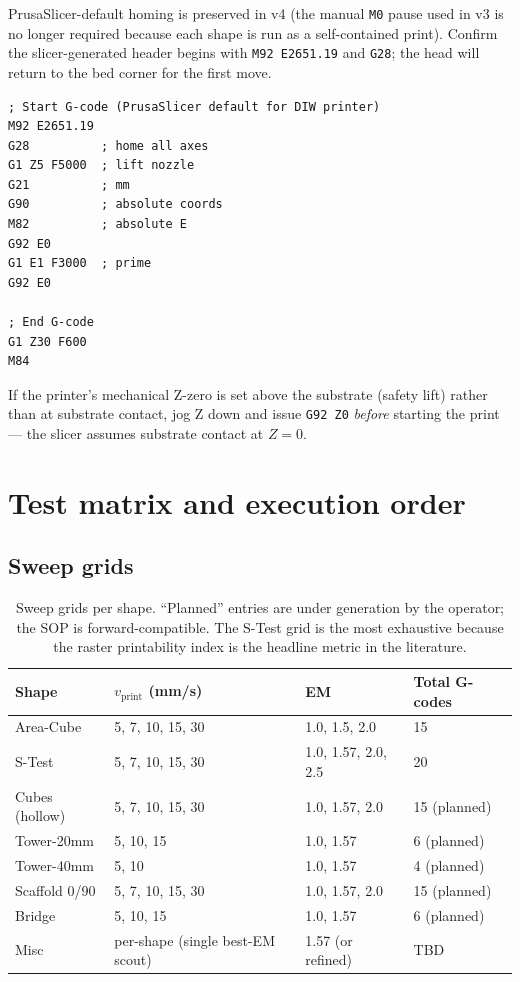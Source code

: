 \documentclass[11pt,a4paper]{article}
\begin{document}
PrusaSlicer-default homing is preserved in v4 (the manual
\texttt{M0} pause used in v3 is no longer required because each
shape is run as a self-contained print). Confirm the
slicer-generated header begins with \texttt{M92 E2651.19} and
\texttt{G28}; the head will return to the bed corner for the
first move.

\begin{lstlisting}[style=shell]
; Start G-code (PrusaSlicer default for DIW printer)
M92 E2651.19
G28          ; home all axes
G1 Z5 F5000  ; lift nozzle
G21          ; mm
G90          ; absolute coords
M82          ; absolute E
G92 E0
G1 E1 F3000  ; prime
G92 E0

; End G-code
G1 Z30 F600
M84
\end{lstlisting}

\begin{warningbox}
If the printer's mechanical Z-zero is set above the substrate
(safety lift) rather than at substrate contact, jog Z down and
issue \texttt{G92 Z0} \emph{before} starting the print --- the
slicer assumes substrate contact at $Z=0$.
\end{warningbox}

\section{Test matrix and execution order}
\label{sec:matrix}

\subsection{Sweep grids}

\begin{table}[h]
\centering
\small
\begin{tabular}{p{2.8cm} p{2.8cm} p{2.8cm} p{2.8cm}}
\toprule
Shape & $v_\mathrm{print}$ (mm/s) & EM & Total G-codes \\
\midrule
Area-Cube & 5, 7, 10, 15, 30 & 1.0, 1.5, 2.0 & 15 \\
S-Test    & 5, 7, 10, 15, 30 & 1.0, 1.57, 2.0, 2.5 & 20 \\
Cubes (hollow) & 5, 7, 10, 15, 30 & 1.0, 1.57, 2.0 & 15 (planned) \\
Tower-20mm & 5, 10, 15 & 1.0, 1.57 & 6 (planned) \\
Tower-40mm & 5, 10 & 1.0, 1.57 & 4 (planned) \\
Scaffold 0/90 & 5, 7, 10, 15, 30 & 1.0, 1.57, 2.0 & 15 (planned) \\
Bridge & 5, 10, 15 & 1.0, 1.57 & 6 (planned) \\
Misc & per-shape (single best-EM scout) & 1.57 (or refined) & TBD \\
\bottomrule
\end{tabular}
\caption{Sweep grids per shape. ``Planned'' entries are
under generation by the operator; the SOP is forward-compatible.
The S-Test grid is the most exhaustive because the raster
printability index is the headline metric in the literature.}
\label{tab:sweep_grids}
\end{table}
\end{document}
